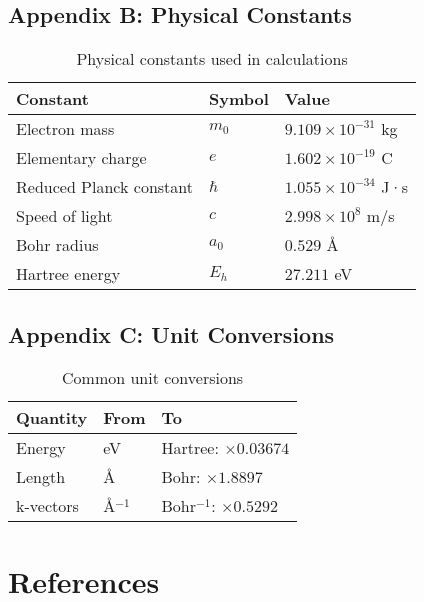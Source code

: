 \documentclass[11pt,a4paper]{article}
\begin{document}
\subsection{Appendix B: Physical Constants}

\begin{table}[H]
\centering
\begin{tabular}{lll}
\toprule
Constant & Symbol & Value \\
\midrule
Electron mass & $m_0$ & $9.109 \times 10^{-31}$ kg \\
Elementary charge & $e$ & $1.602 \times 10^{-19}$ C \\
Reduced Planck constant & $\hbar$ & $1.055 \times 10^{-34}$ J·s \\
Speed of light & $c$ & $2.998 \times 10^8$ m/s \\
Bohr radius & $a_0$ & $0.529$ Å \\
Hartree energy & $E_h$ & $27.211$ eV \\
\bottomrule
\end{tabular}
\caption{Physical constants used in calculations}
\end{table}

\subsection{Appendix C: Unit Conversions}

\begin{table}[H]
\centering
\begin{tabular}{lll}
\toprule
Quantity & From & To \\
\midrule
Energy & eV & Hartree: $\times 0.03674$ \\
Length & Å & Bohr: $\times 1.8897$ \\
k-vectors & Å$^{-1}$ & Bohr$^{-1}$: $\times 0.5292$ \\
\bottomrule
\end{tabular}
\caption{Common unit conversions}
\end{table}

\section{References}
\end{document}
